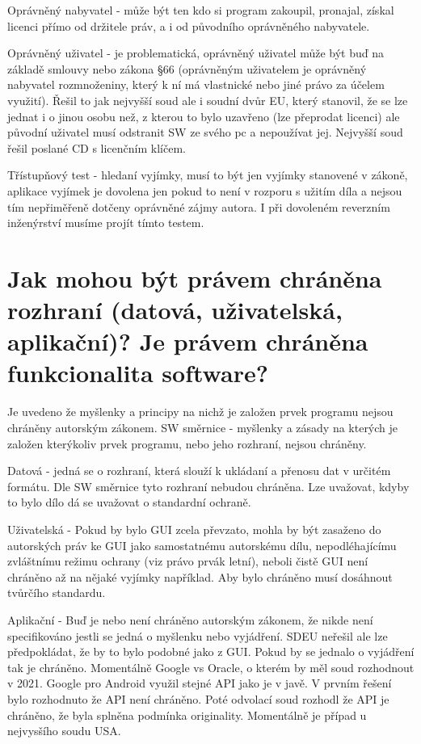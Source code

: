 \documentclass[12pt,a4paper,czech]{article}
\newcommand{\nadpis}[1]{{\section{#1}}}
\begin{document}
Oprávněný nabyvatel - může být ten kdo si program zakoupil, pronajal, získal licenci přímo od držitele práv, a i od původního oprávněného nabyvatele.

Oprávněný uživatel - je problematická, oprávněný uživatel může být buď na základě smlouvy nebo zákona §66 (oprávněným uživatelem je oprávněný nabyvatel rozmnoženiny, který k ní má vlastnické nebo jiné právo za účelem využití). Řešil to jak nejvyšší soud ale i soudní dvůr EU, který stanovil, že se lze jednat i o jinou osobu než, z kterou to bylo uzavřeno (lze přeprodat licenci) ale původní uživatel musí odstranit SW ze svého pc a nepoužívat jej. Nejvyšší soud řešil poslané CD s licenčním klíčem.

Třístupňový test - hledaní vyjímky, musí to být jen vyjímky stanovené v zákoně, aplikace vyjímek je dovolena jen pokud to není v rozporu s užitím díla a nejsou tím nepřiměřeně dotčeny oprávněné zájmy autora. I při dovoleném reverzním inženýrství musíme projít tímto testem.


\vspace{0.5cm} 
\nadpis{Jak mohou být právem chráněna rozhraní (datová, uživatelská, aplikační)? Je právem chráněna funkcionalita software?}

Je uvedeno že myšlenky a principy na nichž je založen prvek programu nejsou chráněny autorským zákonem. SW směrnice - myšlenky a zásady na kterých je založen kterýkoliv prvek programu, nebo jeho rozhraní, nejsou chráněny. 

Datová - jedná se o rozhraní, která slouží k ukládaní a přenosu dat v určitém formátu. Dle SW směrnice tyto rozhraní nebudou chráněna. Lze uvažovat, kdyby to bylo dílo dá se uvažovat o standardní ochraně.

Uživatelská - Pokud by bylo GUI zcela převzato, mohla by být zasaženo do autorských práv ke GUI jako samostatnému autorskému dílu, nepodléhajícímu zvláštnímu režimu ochrany (viz právo prvák letní), neboli čistě GUI není chráněno až na nějaké vyjímky například. Aby bylo chráněno musí dosáhnout tvůrčího standardu.

Aplikační - Buď je nebo není chráněno autorským zákonem, že nikde není specifikováno jestli se jedná o myšlenku nebo vyjádření. SDEU neřešil ale lze předpokládat, že by to bylo podobné jako z GUI. Pokud by se jednalo o vyjádření tak je chráněno. Momentálně Google vs Oracle, o kterém by měl soud rozhodnout v 2021. Google pro Android využil stejné API jako je v javě. V prvním řešení bylo rozhodnuto že API není chráněno. Poté odvolací soud rozhodl že API je chráněno, že byla splněna podmínka originality. Momentálně je případ u nejvysšího soudu USA.
\end{document}
